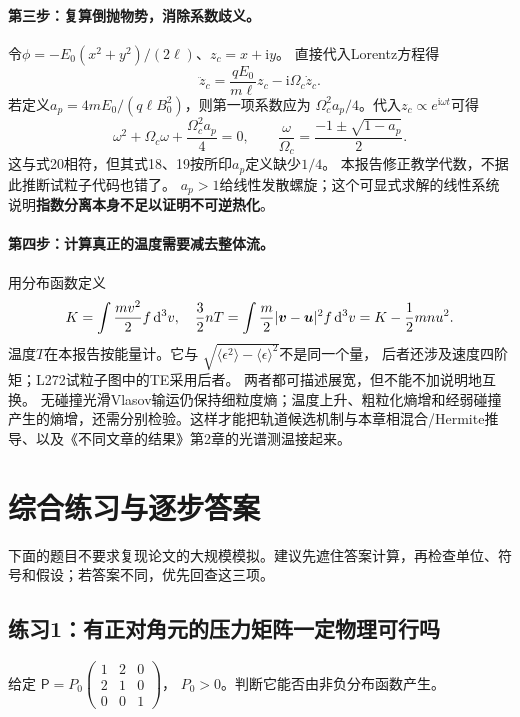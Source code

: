 \documentclass[UTF8,a4paper,11pt,openany,fontset=fandol]{ctexbook}
\begin{document}
\paragraph{第三步：复算倒抛物势，消除系数歧义。}
令$\phi=-E_0(x^2+y^2)/(2\ell)$、$z_c=x+\mathrm i y$。
直接代入Lorentz方程得
\begin{equation}
\ddot z_c=\frac{qE_0}{m\ell}z_c-\mathrm i\Omega_c\dot z_c.
\end{equation}
若定义$a_p=4mE_0/(q\ell B_0^2)$，则第一项系数应为
$\Omega_c^2a_p/4$。代入$z_c\propto e^{\mathrm i\omega t}$可得
\begin{equation}
\omega^2+\Omega_c\omega+\frac{\Omega_c^2a_p}{4}=0,\qquad
\frac{\omega}{\Omega_c}=\frac{-1\pm\sqrt{1-a_p}}{2}.
\end{equation}
这与\citet{L272}式20相符，但其式18、19按所印$a_p$定义缺少$1/4$。
本报告修正教学代数，不据此推断试粒子代码也错了。
$a_p>1$给线性发散螺旋；这个可显式求解的线性系统说明\textbf{指数分离本身不足以证明不可逆热化}。

\paragraph{第四步：计算真正的温度需要减去整体流。}
用分布函数定义
\begin{equation}
K=\int \frac{mv^2}{2}f\,\mathrm d^3v,\quad
\frac32 nT=\int\frac m2|\bm{v}-\bm{u}|^2f\,\mathrm d^3v
=K-\frac12mn u^2 .
\end{equation}
温度$T$在本报告按能量计。它与
$\sqrt{\langle\epsilon^2\rangle-\langle\epsilon\rangle^2}$不是同一个量，
后者还涉及速度四阶矩；L272试粒子图中的TE采用后者。
两者都可描述展宽，但不能不加说明地互换。
无碰撞光滑Vlasov输运仍保持细粒度熵；温度上升、粗粒化熵增和经弱碰撞产生的熵增，还需分别检验。这样才能把轨道候选机制与本章相混合/Hermite推导、以及《不同文章的结果》第2章的光谱测温接起来。

\section{综合练习与逐步答案}
\label{sec:tutorial-exercises}
下面的题目不要求复现论文的大规模模拟。建议先遮住答案计算，再检查单位、符号和假设；若答案不同，优先回查这三项。

\subsection{练习1：有正对角元的压力矩阵一定物理可行吗}
给定
$\mathsf P=P_0\begin{pmatrix}1&2&0\\2&1&0\\0&0&1\end{pmatrix}$，
$P_0>0$。判断它能否由非负分布函数产生。
\end{document}
